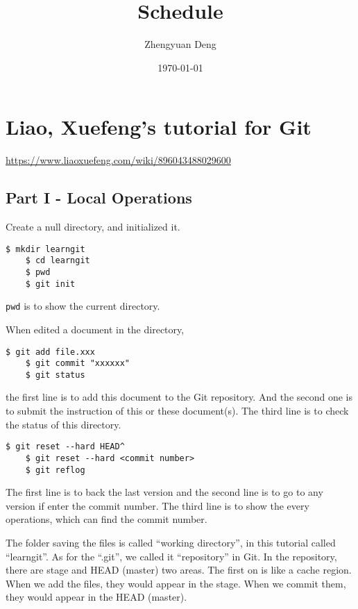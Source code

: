 \documentclass[11pt]{report}
\title{Schedule}
\author{Zhengyuan Deng}
\date{\today}
\begin{document}
\maketitle

\newpage
\tableofcontents
\chapter{Liao, Xuefeng's tutorial for Git}
\url{https://www.liaoxuefeng.com/wiki/896043488029600}
\section{Part I - Local Operations}
Create a null directory, and initialized it.
\begin{lstlisting}[basicstyle=\small\conso]
    $ mkdir learngit
    $ cd learngit
    $ pwd
    $ git init
\end{lstlisting}
\texttt{pwd} is to show the current directory.

When edited a document in the directory, 
\begin{lstlisting}[basicstyle=\small\conso]
    $ git add file.xxx
    $ git commit "xxxxxx"
    $ git status
\end{lstlisting}
the first line is to add this document to the Git repository. 
And the second one is to submit the instruction of this or these document(s). The third line is to check the status of this directory.

\begin{lstlisting}[basicstyle=\small\conso]
    $ git reset --hard HEAD^
    $ git reset --hard <commit number>
    $ git reflog
\end{lstlisting}
The first line is to back the last version and the second line is to go to any version if enter the commit number. 
The third line is to show the every operations, which can find the commit number.

The folder saving the files is called ``working directory'', in this tutorial called ``learngit''. 
As for the ``.git'', we called it ``repository'' in Git. 
In the repository, there are stage and HEAD (master) two areas. 
The first on is like a cache region. When we add the files, they would appear in the stage. 
When we commit them, they would appear in the HEAD (master).
\end{document}
